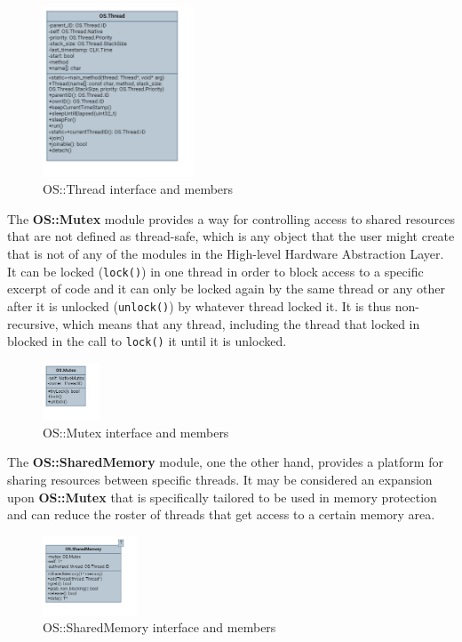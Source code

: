 \begin{figure}[H]
	\centering
	\includegraphics[width=0.4\textwidth]{./img/navig-class-thread.png}
	\caption {OS::Thread interface and members}
	\label{fig:navig-class-thread}
	\end{figure}


The \textbf{OS::Mutex} module provides a way for controlling access to shared resources that are not defined as thread-safe, which is any object that the user might create that is not of any of the modules in the High-level Hardware Abstraction Layer. It can be locked (\texttt{lock()}) in one thread in order to block access to a specific excerpt of code and it can only be locked again by the same thread or any other after it is unlocked (\texttt{unlock()}) by whatever thread locked it. It is thus non-recursive, which means that any thread, including the thread that locked in blocked in the call to \texttt{lock()} it until it is unlocked.

\begin{figure}[H]
	\centering
	\includegraphics[width=0.15\textwidth]{./img/navig-class-mutex.png}
	\caption {OS::Mutex interface and members}
	\label{fig:navig-class-mutex}
	\end{figure}


The \textbf{OS::SharedMemory} module, one the other hand, provides a platform for sharing resources between specific threads. It may be considered an expansion upon \textbf{OS::Mutex} that is specifically tailored to be used in memory protection and can reduce the roster of threads that get access to a certain memory area. 


\begin{figure}[H]
	\centering
	\includegraphics[width=0.25\textwidth]{./img/navig-class-sharedmemory.png}
	\caption {OS::SharedMemory interface and members}
	\label{fig:navig-class-sharedmemory}
	\end{figure}


